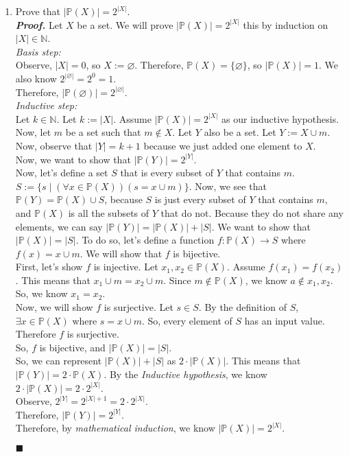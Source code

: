 \documentclass[11pt,a4paper]{article}
\begin{document}
\begin{enumerate}
    \item 
    Prove that $|\mathbb{P}(X) |  = 2^{|X|}$. \\
    \emph{\textbf{Proof.}} Let $X$ be a set. We will prove $|\mathbb{P}(X)| = 2^{|X|} $ this by induction on $|X| \in \mathbb{N} $. \\
    \emph{Basis step:} \\
    Observe, $|X| = 0 $, so $X := \varnothing  $. Therefore, $\mathbb{P}(X)  = \{\varnothing \} $, so $|\mathbb{P}(X)| = 1 $.
    We also know $2^{|\varnothing|} = 2^0 = 1 $. \\
    Therefore, $|\mathbb{P}(\varnothing)| = 2^{|\varnothing|} $. \\
    \emph{Inductive step:} \\
    Let $k \in \mathbb{N} $. Let $k := |X| $. Assume $|\mathbb{P}(X)| = 2^{|X|} $ as our inductive hypothesis. \\
    Now, let $m$ be a set such that $m \notin X$. Let $Y$ also be a set. Let $Y := X \cup m$. Now, observe that $|Y| = k + 1 $ because we just added one element to $X$.                      \\
    Now, we want to show that $|\mathbb{P}(Y)| = 2^{|Y|} $. \\
    Now, let's define a set $S$ that is every subset of $Y$ that contains $m$. \\ 
    $S := \{s \mid (\forall x \in \mathbb{P}(X))(s = x \cup m) \} $. Now, we see that $\mathbb{P}(Y) = \mathbb{P}(X) \cup S $,
    because $S$ is just every subset of $Y$ that contains $m$, and $\mathbb{P}(X) $ is all the subsets of $Y$ that do not. 
    Because they do not share any elements, we can say $|\mathbb{P}(Y)| = |\mathbb{P}(X)| + |S|$. We want to show that $|\mathbb{P}(X)| = |S| $.
    To do so, let's define a function $f: \mathbb{P}(X) \rightarrow S $ where $f(x) = x \cup m $. We will show that $f$ is bijective. \\
    First, let's show $f$ is injective. Let $x_1, x_2 \in \mathbb{P}(X) $. Assume $f(x_1) = f(x_2) $.
    This means that $x_1 \cup m = x_2 \cup m $. Since $m \notin \mathbb{P}(X) $, we know $a \notin x_1, x_2 $. So, we know $x_1 = x_2$. \\
    Now, we will show $f$ is surjective. Let $s \in S$. By the definition of $S$, $\exists x \in \mathbb{P}(X)  $ where $s = x \cup m$. So, every element of $S$ has an input value. Therefore $f$ is surjective. \\
    So, $f$ is bijective, and $|\mathbb{P}(X)| = |S| $. \\
    So, we can represent $|\mathbb{P}(X)| + |S|  $ as $2 \cdot |\mathbb{P}(X)| $. This means that $|\mathbb{P}(Y)| = 2 \cdot \mathbb{P}(X) $. By the \emph{Inductive hypothesis}, we know $2 \cdot |\mathbb{P}(X)| = 2 \cdot 2^{|X|} $. \\
    Observe, $2^{|Y|} =  2^{|X| + 1} = 2 \cdot 2^{|X|}$. \\
    Therefore, $|\mathbb{P}(Y)| = 2^{|Y|} $. \\
    Therefore, by \emph{mathematical induction}, we know $|\mathbb{P}(X) |  = 2^{|X|}$.
    \begin{flushright}
        $\blacksquare$
    \end{flushright} 
    
\end{enumerate}
\end{document}
